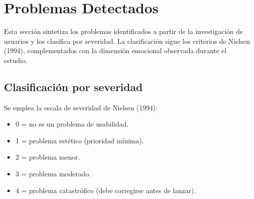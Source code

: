 \section{Problemas Detectados}
Esta sección sintetiza los problemas identificados a partir de la investigación de usuarios y los clasifica por severidad. La clasificación sigue los criterios de Nielsen (1994), complementados con la dimensión emocional observada durante el estudio.

\subsection{Clasificación por severidad}
Se emplea la escala de severidad de Nielsen (1994):

\begin{itemize}
    \item 0 = no es un problema de usabilidad.
    \item 1 = problema estético (prioridad mínima).
    \item 2 = problema menor.
    \item 3 = problema moderado.
    \item 4 = problema catastrófico (debe corregirse antes de lanzar).
\end{itemize}

